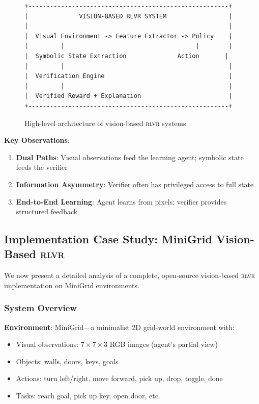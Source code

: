 \documentclass[11pt,a4paper]{article}
\newcommand{\rlvr}{\textsc{rlvr}}
\begin{document}
\begin{figure}[t]
\centering
\begin{verbatim}
+-------------------------------------------------------+
|              VISION-BASED RLVR SYSTEM                 |
|                                                       |
|  Visual Environment -> Feature Extractor -> Policy    |
|         |                                    |        |
|  Symbolic State Extraction              Action       |
|         |                                             |
|  Verification Engine                                  |
|         |                                             |
|  Verified Reward + Explanation                        |
+-------------------------------------------------------+
\end{verbatim}
\caption{High-level architecture of vision-based \rlvr{} systems}
\label{fig:vision_architecture}
\end{figure}

\textbf{Key Observations}:
\begin{enumerate}[leftmargin=*]
    \item \textbf{Dual Paths}: Visual observations feed the learning agent; symbolic state feeds the verifier
    \item \textbf{Information Asymmetry}: Verifier often has privileged access to full state
    \item \textbf{End-to-End Learning}: Agent learns from pixels; verifier provides structured feedback
\end{enumerate}

\subsection{Implementation Case Study: MiniGrid Vision-Based \rlvr{}}
\label{sec:implementation}

We now present a detailed analysis of a complete, open-source vision-based \rlvr{} implementation on MiniGrid environments.

\subsubsection{System Overview}

\textbf{Environment}: MiniGrid---a minimalist 2D grid-world environment with:
\begin{itemize}[leftmargin=*]
    \item Visual observations: $7 \times 7 \times 3$ RGB images (agent's partial view)
    \item Objects: walls, doors, keys, goals
    \item Actions: turn left/right, move forward, pick up, drop, toggle, done
    \item Tasks: reach goal, pick up key, open door, etc.
\end{itemize}
\end{document}
